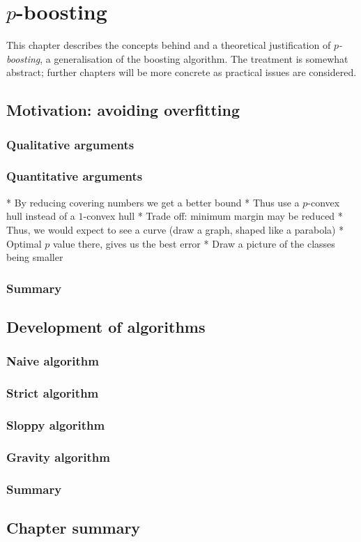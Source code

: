 
\chapter{$p$-boosting}

This chapter describes the concepts behind and a theoretical
justification of \emph{$p$-boosting}, a generalisation of the boosting
algorithm.  The treatment is somewhat abstract; further chapters will
be more concrete as practical issues are considered.

\section{Motivation: avoiding overfitting}

\subsection{Qualitative arguments}

\subsection{Quantitative arguments}
* By reducing covering numbers we get a better bound
* Thus use a $p$-convex hull instead of a $1$-convex hull
* Trade off: minimum margin may be reduced
* Thus, we would expect to see a curve (draw a graph, shaped like a parabola)
* Optimal $p$ value there, gives us the best error
* Draw a picture of the classes being smaller

\subsection{Summary}

\section{Development of algorithms}

\subsection{Naive algorithm}

\subsection{Strict algorithm}

\subsection{Sloppy algorithm}

\subsection{Gravity algorithm}

\subsection{Summary}

\section{Chapter summary}



